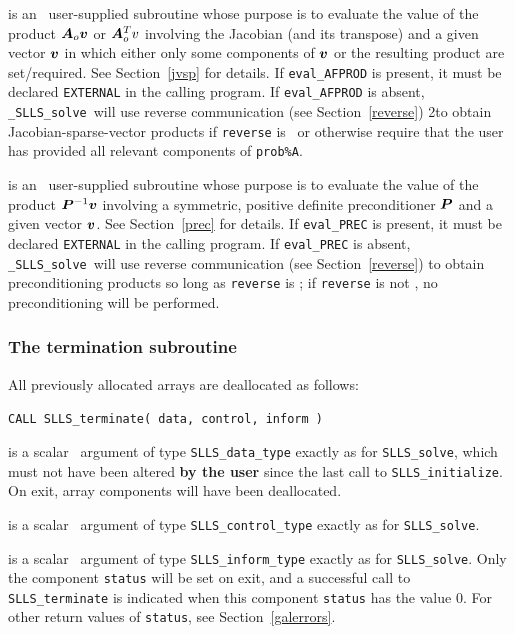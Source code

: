 \documentclass{galahad}
\newcommand{\packagename}{SLLS}
\newcommand{\fullpackagename}{\libraryname\_\packagename}
\newcommand{\solver}{{\tt \fullpackagename\_solve}}
\begin{document}
\begin{description}
 is an \optional\
user-supplied subroutine whose purpose is to evaluate the value of the
product ${\bm{A}}_o {\bm{v}}$ or ${\bm{A}}_o^T v$ involving the Jacobian (and its transpose)
and a given vector ${\bm{v}}$ in which either only some components of ${\bm{v}}$ or
the resulting product are set/required.
See Section~\ref{jvsp} for details.
If {\tt eval\_AFPROD} is present,
it must be declared {\tt EXTERNAL} in the calling program.
If {\tt eval\_AFPROD} is absent, \solver\ will use reverse communication
(see Section~\ref{reverse})
2to obtain Jacobian-sparse-vector products if {\tt reverse} is \present\ or
otherwise require that the user has provided all relevant
components of {\tt prob\%A}.

 is an \optional\
user-supplied subroutine whose purpose is to evaluate the value of the
product ${\bm{P}}^{-1} {\bm{v}}$ involving a symmetric, positive definite 
preconditioner ${\bm{P}}$ and a given vector ${\bm{v}}$.
See Section~\ref{prec} for details.
If {\tt eval\_PREC} is present,
it must be declared {\tt EXTERNAL} in the calling program.
If {\tt eval\_PREC} is absent, \solver\ will use reverse communication
(see Section~\ref{reverse})
to obtain preconditioning products so long as {\tt reverse} is \present;
if {\tt reverse} is not \present, no preconditioning will be performed.

\end{description}


\subsubsection{The  termination subroutine}
All previously allocated arrays are deallocated as follows:
\vspace*{1mm}

\hspace{8mm}
{\tt CALL \packagename\_terminate( data, control, inform )}

\vspace*{-3mm}
\begin{description}

 is a scalar \intentinout\ argument of type
{\tt \packagename\_data\_type}
exactly as for
{\tt \packagename\_solve},
which must not have been altered {\bf by the user} since the last call to
{\tt \packagename\_initialize}.
On exit, array components will have been deallocated.

 is a scalar \intentin\ argument of type
{\tt \packagename\_control\_type}
exactly as for
{\tt \packagename\_solve}.

 is a scalar \intentout\ argument of type
{\tt \packagename\_inform\_type}
exactly as for
{\tt \packagename\_solve}.
Only the component {\tt status} will be set on exit, and a
successful call to
{\tt \packagename\_terminate}
is indicated when this  component {\tt status} has the value 0.
For other return values of {\tt status}, see Section~\ref{galerrors}.

\end{description}
\end{document}
